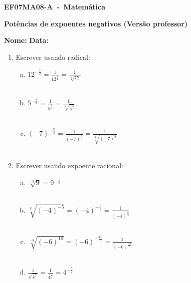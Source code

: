 \documentclass[a4paper,14pt]{article}
\begin{document}
	
	\noindent\textbf{EF07MA08-A~-~Matemática} 
	
	\begin{center}
		\textbf{Potências de expoentes negativos (Versão professor)}
	\end{center}
	
	
	\noindent\textbf{Nome:} \underline{\hspace{10cm}}
    \noindent\textbf{Data:} \underline{\hspace{4cm}}
	
	
	\begin{multicols}{2}
	\begin{enumerate}	
		\item Escrever usando radical:
		\begin{enumerate}[a)]
			\item $12^{-\frac{1}{4}} = \frac{1}{12^\frac{1}{4}} = \frac{1}{\sqrt[4]{12}}$ \\\\
			\item $5^{-\frac{5}{6}} = \frac{1}{5^{\frac{5}{6}}} = \frac{1}{\sqrt[6]{5^5}}$ \\\\
			\item $(-7)^{-\frac{8}{3}} = \frac{1}{(-7)^{\frac{8}{3}}} = \frac{1}{\sqrt[3]{(-7)^8}}$ \\\\
	    \end{enumerate}
        \item Escrever usando expoente racional:
        \begin{enumerate}[a)]
        	\item $\sqrt[-5]{9} = 9^{-\frac{1}{5}}$ \\\\
        	\item $\sqrt[9]{(-4)^{-5}} = (-4)^{-\frac{5}{9}} = \frac{1}{(-4)^\frac{5}{9}}$ \\\\
        	\item $\sqrt[-5]{(-6)^{10}} = (-6)^{-\frac{10}{5}} = \frac{1}{(-6)^\frac{10}{5}}$ \\\\
        	\item $\frac{1}{\sqrt{4^5}} = \frac{1}{4^\frac{5}{2}} = 4^{-\frac{5}{2}}$ \\\\\\\\

\end{enumerate}
\end{enumerate}
\end{multicols}
\end{document}
